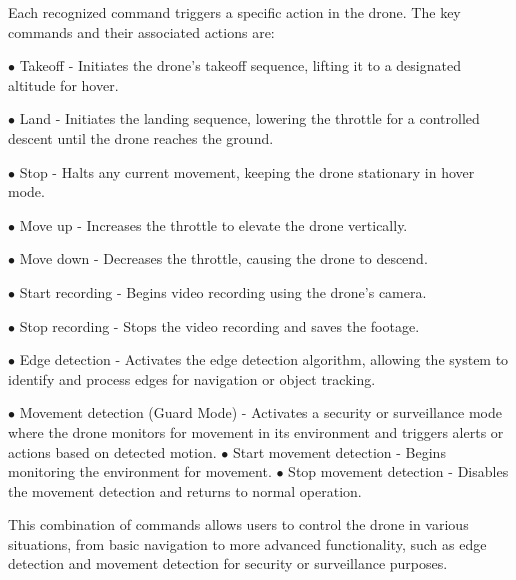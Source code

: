 \documentclass[unnumsec,webpdf,modern,large]{mam-authoring-template}%
\begin{document}
Each recognized command triggers a specific action in the drone. The key commands and their associated actions are:
\begin{description}
\item $\bullet$ Takeoff - Initiates the drone's takeoff sequence, lifting it to a designated altitude for hover.
\item $\bullet$ Land - Initiates the landing sequence, lowering the throttle for a controlled descent until the drone reaches the ground.
\item $\bullet$ Stop - Halts any current movement, keeping the drone stationary in hover mode.
\item $\bullet$ Move up - Increases the throttle to elevate the drone vertically.
\item $\bullet$ Move down - Decreases the throttle, causing the drone to descend.
\item $\bullet$ Start recording - Begins video recording using the drone's camera.
\item $\bullet$ Stop recording - Stops the video recording and saves the footage.
\item $\bullet$ Edge detection - Activates the edge detection algorithm, allowing the system to identify and process edges for navigation or object tracking.
\item $\bullet$ Movement detection (Guard Mode) - Activates a security or surveillance mode where the drone monitors for movement in its environment and triggers alerts or actions based on detected motion.
\subitem $\bullet$ Start movement detection - Begins monitoring the environment for movement.
\subitem $\bullet$ Stop movement detection - Disables the movement detection and returns to normal operation.
\end{description}
This combination of commands allows users to control the drone in various situations, from basic navigation to more advanced functionality, such as edge detection and movement detection for security or surveillance purposes.
\end{document}
